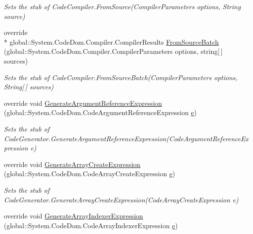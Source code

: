 \begin{DoxyCompactItemize}
\begin{DoxyCompactList}\small\item\em Sets the stub of Code\-Compiler.\-From\-Source(\-Compiler\-Parameters options, String source)\end{DoxyCompactList}\item 
override \\*
global\-::\-System.\-Code\-Dom.\-Compiler.\-Compiler\-Results \hyperlink{class_system_1_1_code_dom_1_1_compiler_1_1_fakes_1_1_stub_code_compiler_ad6bc8defb0e9dd28e62f81bb901c9e98}{From\-Source\-Batch} (global\-::\-System.\-Code\-Dom.\-Compiler.\-Compiler\-Parameters options, string\mbox{[}$\,$\mbox{]} sources)
\begin{DoxyCompactList}\small\item\em Sets the stub of Code\-Compiler.\-From\-Source\-Batch(\-Compiler\-Parameters options, String\mbox{[}$\,$\mbox{]} sources)\end{DoxyCompactList}\item 
override void \hyperlink{class_system_1_1_code_dom_1_1_compiler_1_1_fakes_1_1_stub_code_compiler_ace4870bb9e289a706864f7a44153be92}{Generate\-Argument\-Reference\-Expression} (global\-::\-System.\-Code\-Dom.\-Code\-Argument\-Reference\-Expression \hyperlink{jquery-1_810_82_8min_8js_a2c038346d47955cbe2cb91e338edd7e1}{e})
\begin{DoxyCompactList}\small\item\em Sets the stub of Code\-Generator.\-Generate\-Argument\-Reference\-Expression(\-Code\-Argument\-Reference\-Expression e)\end{DoxyCompactList}\item 
override void \hyperlink{class_system_1_1_code_dom_1_1_compiler_1_1_fakes_1_1_stub_code_compiler_a5348e9217a5f6e9591d241f5995f2088}{Generate\-Array\-Create\-Expression} (global\-::\-System.\-Code\-Dom.\-Code\-Array\-Create\-Expression \hyperlink{jquery-1_810_82_8min_8js_a2c038346d47955cbe2cb91e338edd7e1}{e})
\begin{DoxyCompactList}\small\item\em Sets the stub of Code\-Generator.\-Generate\-Array\-Create\-Expression(\-Code\-Array\-Create\-Expression e)\end{DoxyCompactList}\item 
override void \hyperlink{class_system_1_1_code_dom_1_1_compiler_1_1_fakes_1_1_stub_code_compiler_a9e8f5b6b11b92ee2ab3e0eed26927758}{Generate\-Array\-Indexer\-Expression} (global\-::\-System.\-Code\-Dom.\-Code\-Array\-Indexer\-Expression \hyperlink{jquery-1_810_82_8min_8js_a2c038346d47955cbe2cb91e338edd7e1}{e})

\end{DoxyCompactItemize}
